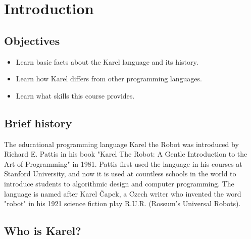 \section{Introduction}

\subsection{Objectives} 

\begin{itemize}
\item Learn basic facts about the Karel language and its history. 
\item Learn how Karel differs from other programming languages.
\item Learn what skills this course provides.
\end{itemize}

\subsection{Brief history}

The educational programming language Karel the Robot was introduced by Richard E. 
Pattis in his book "Karel The Robot: A Gentle Introduction to the Art of Programming" in 1981. 
Pattis first used the language in his courses at Stanford University, and now it is used at 
countless schools in the world to introduce students to algorithmic design and computer programming. 
The language is named after Karel \v{C}apek, a Czech writer who invented the word "robot" in his 1921 
science fiction play R.U.R. (Rossum's Universal Robots).

\subsection{Who is Karel?}

